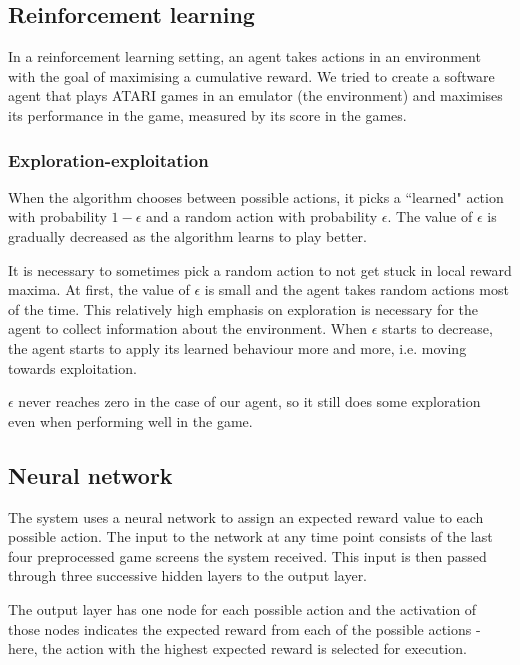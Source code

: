 \documentclass[a4paper,12pt]{article}
\begin{document}
\subsection{Reinforcement learning}
In a reinforcement learning setting, an agent takes actions in an environment with the goal of maximising a cumulative reward. We tried to create a software agent that plays ATARI games in an emulator (the environment) and maximises its performance in the game, measured by its score in the games.

\subsubsection{Exploration-exploitation}
When the algorithm chooses between possible actions, it picks a ``learned" action with probability $1-\epsilon$ and a random action with probability $\epsilon$. The value of $\epsilon$ is gradually decreased as the algorithm learns to play better.

It is necessary to sometimes pick a random action to not get stuck in local reward maxima. At first, the value of $\epsilon$ is small and the agent takes random actions most of the time. This relatively high emphasis on exploration is necessary for the agent to collect information about the environment. When $\epsilon$ starts to decrease, the agent starts to apply its learned behaviour more and more, i.e. moving towards exploitation.

$\epsilon$ never reaches zero in the case of our agent, so it still does some exploration even when performing well in the game.

\subsection{Neural network}
The system uses a neural network to assign an expected reward value to each possible action. The input to the network at any time point consists of the last four preprocessed game screens the system received. This input is then passed through three successive hidden layers to the output layer. 

The output layer has one node for each possible action and the activation of those nodes indicates the expected reward from each of the possible actions - here, the action with the highest expected reward is selected for execution.
\end{document}
